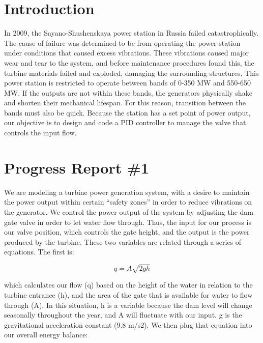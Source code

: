 \documentclass{article}
\begin{document}
    \begin{multicols*}{2}
        \newlength{\mywidth}
        \setlength{\mywidth}{\linewidth}
        \addtolength{\mywidth}{-0.5\columnsep}

        \section{Introduction}

        In 2009, the Sayano-Shushenskaya power station in Russia failed catastrophically.  The cause of failure was determined to be from operating the power station under conditions that caused excess vibrations. These vibrations caused major wear and tear to the system, and before maintenance procedures found this, the turbine materials failed and exploded, damaging the surrounding structures.  This power station is restricted to operate between bands of 0-350 MW and 550-650 MW. If the outputs are not within these bands, the generators physically shake and shorten their mechanical lifespan.  For this reason, transition between the bands must also be quick. Because the station has a set point of power output, our objective is to design and code a PID controller to manage the valve that controls the input flow. 

        \section{Progress Report \#1}

        We are modeling a turbine power generation system, with a desire to maintain the power output within certain “safety zones” in order to reduce vibrations on the generator. We control the power output of the system by adjusting the dam gate valve in order to let water flow through. Thus, the input for our process is our valve position, which controls the gate height, and the output is the power produced by the turbine. These two variables are related through a series of equations. The first is: 

        \begin{equation}
            q=A\sqrt{2gh}
        \end{equation}

        which calculates our flow (q) based on the height of the water in relation to the turbine entrance (h), and the area of the gate that is available for water to flow through (A). In this situation, h is a variable because the dam level will change seasonally throughout the year, and A will fluctuate with our input. g is the gravitational acceleration constant (9.8 m/s2). We then plug that equation into our overall energy balance:


\end{multicols*}
\end{document}
